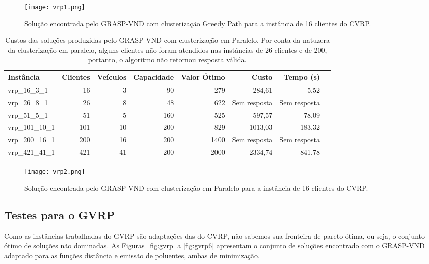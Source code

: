 \documentclass[12pt, a4paper]{article}
\begin{document}
\begin{figure}[htb!]
\centering
\texttt{[image: vrp1.png]}
\caption{Solução encontrada pelo GRASP-VND com clusterização Greedy Path para a instância de 16 clientes do CVRP.}
\label{fig:vrpteste1}
\end{figure}

\begin{table}[htb!]
  \begin{center}
    \begin{tabular}{l|r|r|r|r|r|r|r}
      \toprule %
      \textbf{Instância} & \textbf{Clientes} & \textbf{Veículos} & \textbf{Capacidade} & \textbf{Valor Ótimo} & \textbf{Custo} & \textbf{Tempo (s)}\\
      \midrule %
      vrp\_16\_3\_1 & 16 & 3 & 90 & 279 & 284,61 & 5,52\\
      vrp\_26\_8\_1 & 26 & 8 & 48 & 622 & Sem resposta & Sem resposta\\ 
      vrp\_51\_5\_1 & 51 & 5 & 160 & 525 & 597,57 & 78,09 \\
      vrp\_101\_10\_1 & 101 & 10 & 200 & 829 & 1013,03 & 183,32\\
      vrp\_200\_16\_1 & 200 & 16 & 200 & 1400 & Sem resposta & Sem resposta\\
      vrp\_421\_41\_1 & 421 & 41 & 200 & 2000 & 2334,74 & 841,78\\
      \bottomrule %
    \end{tabular}
    \caption{Custos das soluções produzidas pelo GRASP-VND com clusterização em Paralelo. Por conta da natuzera da clusterização em paralelo, alguns clientes não foram atendidos nas instâncias de 26 clientes e de 200, portanto, o algoritmo não retornou resposta válida.}
    \label{tab:table2}
  \end{center}
\end{table}

\begin{figure}[htb!]
\centering
\texttt{[image: vrp2.png]}
\caption{Solução encontrada pelo GRASP-VND com clusterização em Paralelo para a instância de 16 clientes do CVRP.}
\label{fig:vrpteste2}
\end{figure}


\subsection{Testes para o GVRP}

Como as instâncias trabalhadas do GVRP são adaptações das do CVRP, não sabemos sua fronteira de pareto ótima, ou seja, o conjunto ótimo de soluções não dominadas. As Figuras~\ref{fig:gvrp} a \ref{fig:gvrp6} apresentam o conjunto de soluções encontrado com o GRASP-VND adaptado para as funções distância e emissão de poluentes, ambas de minimização.
\end{document}
